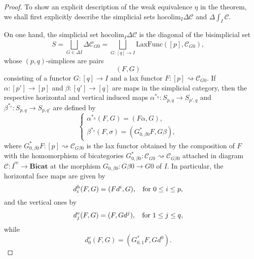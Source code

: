 \documentclass[]{amsart}
\begin{document}
\begin{proof} To show an explicit description of the weak equivalence $\eta$ in the theorem, we shall first  explicitly  describe the simplicial sets ${\ensuremath{\mathrm{hocolim}}}_I{\ensuremath{\Delta}}{\ensuremath{\mathcal{C}}}$ and ${\ensuremath{\Delta}}\int_I{\ensuremath{\mathcal{C}}}$.

On one hand, the simplicial set ${\ensuremath{\mathrm{hocolim}}}_I{\ensuremath{\Delta}}{\ensuremath{\mathcal{C}}}$ is the diagonal of the bisimplicial set
\begin{equation}\label{s}
S=\bigsqcup_{G\in{\ensuremath{\Delta}} I}{\ensuremath{\Delta}}{\ensuremath{\mathcal{C}}}_{G 0}=\bigsqcup_{G:[q]\to I}{\ensuremath{\mathrm{LaxFunc}}}([p],{\ensuremath{\mathcal{C}}}_{G 0}),
\end{equation}
whose $(p,q)$-simplices are pairs
$$
(F,G)
$$
consisting of a functor $G:[q]\to I$ and a lax functor $F:[p]\rightsquigarrow {\ensuremath{\mathcal{C}}}_{G0}$. If
$\alpha:[p']\to [p]$ and $\beta:[q']\to [q]$ are maps in the simplicial category, then the
respective horizontal and vertical induced maps $\alpha^{*_h}: S_{p,q}\to S_{p',q}$ and
$\beta^{*_v}: S_{p,q}\to
S_{p,q'}$ are defined by $$\left\{\begin{array}{l}\alpha^{*_h}(F,G)=(F\alpha,G),\\[6pt] \beta^{*_v}(F,\sigma)=
(G_{0,\beta 0}^*F,G\beta),\end{array}\right.$$ where $G_{0,\beta 0}^*F:[p]\rightsquigarrow
{\ensuremath{\mathcal{C}}}_{G\beta 0}$ is the lax functor obtained by the composition of $F$ with the homomorphism of
bicategories $G_{0,\beta 0}^*:{\ensuremath{\mathcal{C}}}_{G0}\rightsquigarrow {\ensuremath{\mathcal{C}}}_{G\beta0}$ attached in diagram
${\ensuremath{\mathcal{C}}}:I^{{^\mathrm{op}}}\to{\ensuremath{\mathbf{Bicat}}} $ at the morphism $G_{0,\beta0}:G\beta0\to G0$ of $I$. In
particular, the horizontal face maps are given by $$d_i^h(F,G)=(Fd^i, G), \hspace{0.2cm} \text{ for
} 0\leq i\leq p,$$ and the vertical ones by
$$d_j^v(F,G)=(F, Gd^j), \hspace{0.2cm} \text{ for } 1\leq j\leq q,$$
while
$$d_0^v(F,G)=(G_{0,1}^*F, Gd^0).$$


\end{proof}
\end{document}
